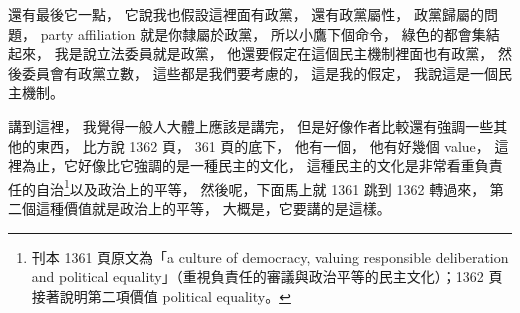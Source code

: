 \hypertarget{w06:cue:1457}{}還有最後它一點，
\hypertarget{w06:cue:1458}{}它說我也假設這裡面有政黨，
\hypertarget{w06:cue:1459}{}還有政黨屬性，
\hypertarget{w06:cue:1460}{}政黨歸屬的問題，
\hypertarget{w06:cue:1461}{}party affiliation
\hypertarget{w06:cue:1462}{}就是你隸屬於政黨，
\hypertarget{w06:cue:1463}{}所以小鷹下個命令，
\hypertarget{w06:cue:1464}{}綠色的都會集結起來，
\hypertarget{w06:cue:1465}{}我是說立法委員就是政黨，
\hypertarget{w06:cue:1466}{}他還要假定在這個民主機制裡面也有政黨，
\hypertarget{w06:cue:1467}{}然後委員會有政黨立數，
\hypertarget{w06:cue:1468}{}這些都是我們要考慮的，
\hypertarget{w06:cue:1469}{}這是我的假定，
\hypertarget{w06:cue:1470}{}我說這是一個民主機制。

\hypertarget{w06:cue:1471}{}講到這裡，
\hypertarget{w06:cue:1472}{}我覺得一般人大體上應該是講完，
\hypertarget{w06:cue:1473}{}但是好像作者比較還有強調一些其他的東西，
\hypertarget{w06:cue:1474}{}比方說 1362 頁，
\hypertarget{w06:cue:1475}{}361 頁的底下，
\hypertarget{w06:cue:1476}{}他有一個，
\hypertarget{w06:cue:1477}{}他有好幾個 value，
\hypertarget{w06:cue:1478}{}這裡為止，它好像比它強調的是一種民主的文化，
\hypertarget{w06:cue:1479}{}這種民主的文化是非常看重負責任的自治\footnote{刊本 1361 頁原文為「a culture of democracy, valuing responsible deliberation and political equality」（重視負責任的審議與政治平等的民主文化）；1362 頁接著說明第二項價值 political equality。}以及政治上的平等，
\hypertarget{w06:cue:1480}{}然後呢，下面馬上就 1361 跳到 1362 轉過來，
\hypertarget{w06:cue:1481}{}第二個這種價值就是政治上的平等，
\hypertarget{w06:cue:1482}{}大概是，它要講的是這樣。

